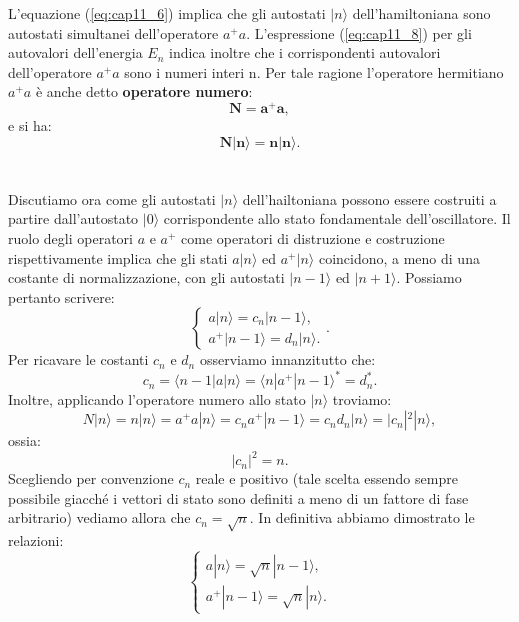  L'equazione (\ref{eq:cap11_6}) implica che gli autostati $|n\rangle$ dell'hamiltoniana sono autostati simultanei dell'operatore $a^+a$. L'espressione (\ref{eq:cap11_8}) per gli autovalori dell'energia $E_n$ indica inoltre che i corrispondenti autovalori dell'operatore $a^+a$ sono i numeri interi n. Per tale ragione l'operatore hermitiano $a^+a$ è anche detto \textbf{operatore numero}:
\begin{equation}
\mathbf{N=a^+a},
\end{equation}
e si ha:
\begin{equation}
\mathbf{N|n\rangle=n|n\rangle}.
\end{equation}
\\\\
 Discutiamo ora come gli autostati $|n\rangle$ dell'hailtoniana possono essere costruiti a partire dall'autostato $|0\rangle$ corrispondente allo stato fondamentale dell'oscillatore.
 Il ruolo degli operatori $a$ e $a^+$ come operatori di distruzione e costruzione rispettivamente implica che gli stati $a|n\rangle$ ed $a^+|n\rangle$ coincidono, a meno di una costante di normalizzazione, con gli autostati $|n-1\rangle$ ed $|n+1\rangle$. Possiamo pertanto scrivere:
\begin{equation}
\begin{cases}
a|n\rangle=c_n|n-1\rangle,\\
a^+|n-1\rangle=d_n|n\rangle.
\end{cases}.
\end{equation}
 Per ricavare le costanti $c_n$ e $d_n$ osserviamo innanzitutto che:
\begin{equation}
c_n=\langle n-1|a|n\rangle=\langle n|a^+|n-1\rangle^*=d_n^*.
\end{equation}
 Inoltre, applicando l'operatore numero allo stato $|n\rangle$ troviamo:
\begin{equation}
N|n\rangle=n|n\rangle=a^+a|n\rangle=c_na^+|n-1\rangle=c_nd_n|n\rangle=|c_n|^2|n\rangle,
\end{equation}
ossia:
\begin{equation}
|c_n|^2=n.
\end{equation}
Scegliendo per convenzione $c_n$ reale e positivo (tale scelta essendo sempre possibile giacché i vettori di stato sono definiti a meno di un fattore di fase arbitrario) vediamo allora che $c_n=\sqrt{n}$. In definitiva abbiamo dimostrato le relazioni:
\begin{equation} \label{eq:cap11_9}
\begin{cases}
a|n\rangle= \sqrt{n} |n-1\rangle, \\
a^+|n-1\rangle=\sqrt{n}|n\rangle.
\end{cases}
\end{equation}
